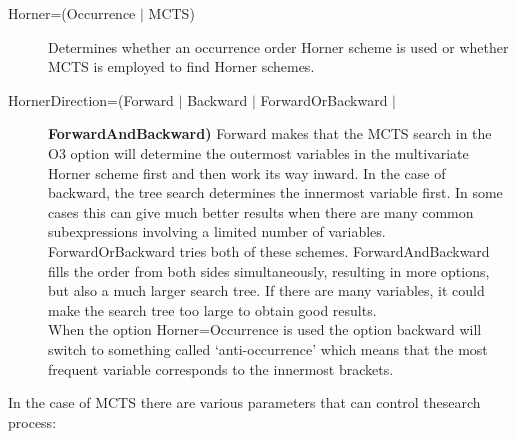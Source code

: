 \begin{description}
\item[Horner=(Occurrence $|$ MCTS)] Determines whether an 
  occurrence order Horner scheme is used
  or whether MCTS is employed to
  find Horner schemes.

\item[HornerDirection=(Forward $|$ Backward $|$ ForwardOrBackward $|$] \hfill
  {\bf ForwardAndBackward)}
  Forward makes that the MCTS search in the O3 option will 
  determine the outermost variables in the multivariate Horner scheme first 
  and then work its way inward.
  In the case of backward, the tree search determines the innermost variable 
  first. In some cases this can give much better results when there are 
  many common subexpressions involving a limited number of variables.
  ForwardOrBackward tries both of these
  schemes. ForwardAndBackward fills the order from both sides
  simultaneously, resulting in more options, but also a much larger
  search tree. If there are many variables, it could make the search tree 
  too large to obtain good results. \hfill \\
  When the option Horner=Occurrence is used the option backward will switch 
  to something called `anti-occurrence' which means that the most frequent 
  variable corresponds to the innermost brackets.
\end{description}

In the case of MCTS there are 
various parameters that can control thesearch process:

